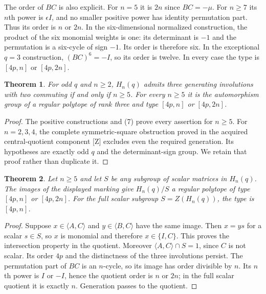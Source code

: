 \documentclass[11pt,a4paper]{article}
\newtheorem{theorem}{Theorem}
\begin{document}
The order of $BC$ is also explicit. For $n=5$ it is $2n$ since
$BC=-\mu$. For $n\ge7$ its $n$th power is $\epsilon I$, and
no smaller positive power has identity permutation part. Thus its
order is $n$ or $2n$. In the six-dimensional normalized construction,
the product of the six monomial weights is one: its determinant is
$-1$ and the permutation is a six-cycle of sign $-1$. Its order is
therefore six. In the exceptional $q=3$ construction, $(BC)^6=-I$,
so its order is twelve. In every case the type is $[4p,n]$ or
$[4p,2n]$.

\begin{theorem}
For odd $q$ and $n\ge2$, $H_n(q)$ admits three generating involutions
with two commuting if and only if $n\ge5$. For every $n\ge5$ it is
the automorphism group of a regular polytope of rank three and type
$[4p,n]$ or $[4p,2n]$.
\end{theorem}
\begin{proof}
The positive constructions and (7) prove every assertion for $n\ge5$.
For $n=2,3,4$, the complete symmetric-square obstruction proved in
the acquired central-quotient component [Z] excludes even the required
generation. Its hypotheses are exactly odd $q$ and the determinant-sign
group. We retain that proof rather than duplicate it.
\end{proof}

\begin{theorem}
Let $n\ge5$ and let $S$ be any subgroup of scalar matrices in $H_n(q)$.
The images of the displayed marking give $H_n(q)/S$ a regular polytope
of type $[4p,n]$ or $[4p,2n]$. For the full scalar subgroup
$S=Z(H_n(q))$, the type is $[4p,n]$.
\end{theorem}
\begin{proof}
Suppose $x\in\langle A,C\rangle$ and $y\in\langle B,C\rangle$
have the same image. Then $x=ys$ for a scalar $s\in S$, so $x$ is
monomial and therefore $x\in\{I,C\}$. This proves the intersection
property in the quotient. Moreover $\langle A,C\rangle\cap S=1$,
since $C$ is not scalar. Its order $4p$ and the distinctness of the
three involutions persist. The permutation part of $BC$ is an
$n$-cycle, so its image has order divisible by $n$. Its $n$th power
is $I$ or $-I$, hence the quotient order is $n$ or $2n$; in the full
scalar quotient it is exactly $n$. Generation passes to the quotient.
\end{proof}
\end{document}
